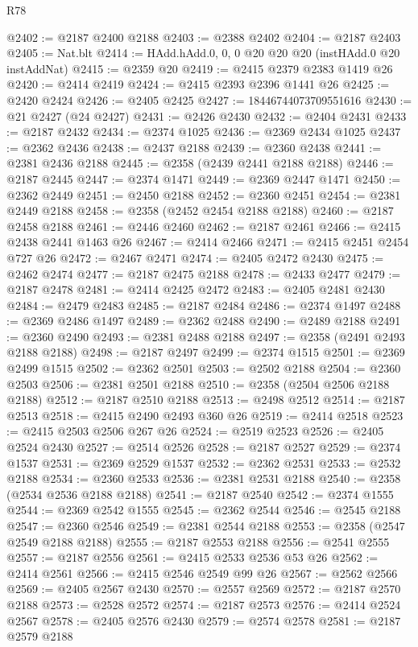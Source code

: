 \begin{lexlean}{R78}
\begin{coremodule}
@2402 := @2187 @2400 @2188
@2403 := @2388 @2402
@2404 := @2187 @2403
@2405 := Nat.blt
@2414 := HAdd.hAdd.{0, 0, 0} @20 @20 @20 (instHAdd.{0} @20 instAddNat)
@2415 := @2359 @20
@2419 := @2415 @2379 @2383 @1419 @26
@2420 := @2414 @2419
@2424 := @2415 @2393 @2396 @1441 @26
@2425 := @2420 @2424
@2426 := @2405 @2425
@2427 := 18446744073709551616
@2430 := @21 @2427 (@24 @2427)
@2431 := @2426 @2430
@2432 := @2404 @2431
@2433 := @2187 @2432
@2434 := @2374 @1025
@2436 := @2369 @2434 @1025
@2437 := @2362 @2436
@2438 := @2437 @2188
@2439 := @2360 @2438
@2441 := @2381 @2436 @2188
@2445 := @2358 (@2439 @2441 @2188 @2188)
@2446 := @2187 @2445
@2447 := @2374 @1471
@2449 := @2369 @2447 @1471
@2450 := @2362 @2449
@2451 := @2450 @2188
@2452 := @2360 @2451
@2454 := @2381 @2449 @2188
@2458 := @2358 (@2452 @2454 @2188 @2188)
@2460 := @2187 @2458 @2188
@2461 := @2446 @2460
@2462 := @2187 @2461
@2466 := @2415 @2438 @2441 @1463 @26
@2467 := @2414 @2466
@2471 := @2415 @2451 @2454 @727 @26
@2472 := @2467 @2471
@2474 := @2405 @2472 @2430
@2475 := @2462 @2474
@2477 := @2187 @2475 @2188
@2478 := @2433 @2477
@2479 := @2187 @2478
@2481 := @2414 @2425 @2472
@2483 := @2405 @2481 @2430
@2484 := @2479 @2483
@2485 := @2187 @2484
@2486 := @2374 @1497
@2488 := @2369 @2486 @1497
@2489 := @2362 @2488
@2490 := @2489 @2188
@2491 := @2360 @2490
@2493 := @2381 @2488 @2188
@2497 := @2358 (@2491 @2493 @2188 @2188)
@2498 := @2187 @2497
@2499 := @2374 @1515
@2501 := @2369 @2499 @1515
@2502 := @2362 @2501
@2503 := @2502 @2188
@2504 := @2360 @2503
@2506 := @2381 @2501 @2188
@2510 := @2358 (@2504 @2506 @2188 @2188)
@2512 := @2187 @2510 @2188
@2513 := @2498 @2512
@2514 := @2187 @2513
@2518 := @2415 @2490 @2493 @360 @26
@2519 := @2414 @2518
@2523 := @2415 @2503 @2506 @267 @26
@2524 := @2519 @2523
@2526 := @2405 @2524 @2430
@2527 := @2514 @2526
@2528 := @2187 @2527
@2529 := @2374 @1537
@2531 := @2369 @2529 @1537
@2532 := @2362 @2531
@2533 := @2532 @2188
@2534 := @2360 @2533
@2536 := @2381 @2531 @2188
@2540 := @2358 (@2534 @2536 @2188 @2188)
@2541 := @2187 @2540
@2542 := @2374 @1555
@2544 := @2369 @2542 @1555
@2545 := @2362 @2544
@2546 := @2545 @2188
@2547 := @2360 @2546
@2549 := @2381 @2544 @2188
@2553 := @2358 (@2547 @2549 @2188 @2188)
@2555 := @2187 @2553 @2188
@2556 := @2541 @2555
@2557 := @2187 @2556
@2561 := @2415 @2533 @2536 @53 @26
@2562 := @2414 @2561
@2566 := @2415 @2546 @2549 @99 @26
@2567 := @2562 @2566
@2569 := @2405 @2567 @2430
@2570 := @2557 @2569
@2572 := @2187 @2570 @2188
@2573 := @2528 @2572
@2574 := @2187 @2573
@2576 := @2414 @2524 @2567
@2578 := @2405 @2576 @2430
@2579 := @2574 @2578
@2581 := @2187 @2579 @2188

\end{coremodule}
\end{lexlean}
